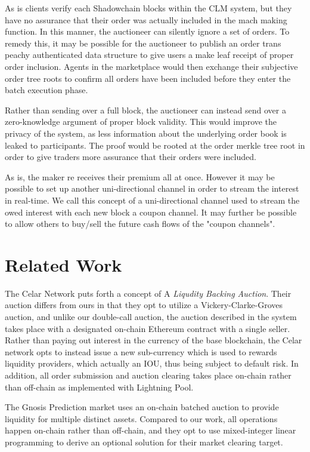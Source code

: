 \documentclass[10pt,a4paper]{article}
\theoremstyle{definition}
\begin{document}
As is clients verify each Shadowchain blocks within the CLM system, but they
have no assurance that their order was actually included in the mach making
function. In this manner, the auctioneer can silently ignore a set of orders.
To remedy this, it may be possible for the auctioneer to publish an order trans
peachy authenticated data structure to give users a make leaf receipt of proper
order inclusion. Agents in the marketplace would then exchange their subjective
order tree roots to confirm all orders have been included before they enter the
batch execution phase.

Rather than sending over a full block, the auctioneer can instead send over a
zero-knowledge argument of proper block validity. This would improve the privacy of the
system, as less information about the underlying order book is leaked to
participants. The proof would be rooted at the order merkle tree root in order
to give traders more assurance that their orders were included.

As is, the maker re receives their premium all at once. However it may be
possible to set up another uni-directional channel in order to stream the
interest in real-time. We call this concept of a uni-directional channel used
to stream the owed interest with each new block a coupon channel. It may
further be possible to allow others to buy/sell the future cash flows of the
"coupon channels".

\section{Related Work}

The Celar Network \cite{celarnet} puts forth a concept of A \emph{Liqudity
Backing Auction}. Their auction differs from ours in that they opt to utilize a
Vickery-Clarke-Groves auction, and unlike our double-call auction, the auction
described in the system takes place with a designated on-chain Ethereum
contract with a single seller. Rather than paying out interest in the currency
of the base blockchain, the Celar network opts to instead issue a new
sub-currency which is used to rewards liquidity providers, which actually an
IOU, thus being subject to default risk. In addition, all order submission and
auction clearing takes place on-chain rather than off-chain as implemented with
Lightning Pool. 

The Gnosis Prediction \cite{gnosis} market uses an on-chain batched auction to
provide liquidity for multiple distinct assets. Compared to our work, all
operations happen on-chain rather than off-chain, and they opt to use
mixed-integer linear programming to derive an optional solution for their
market clearing target.
\end{document}
